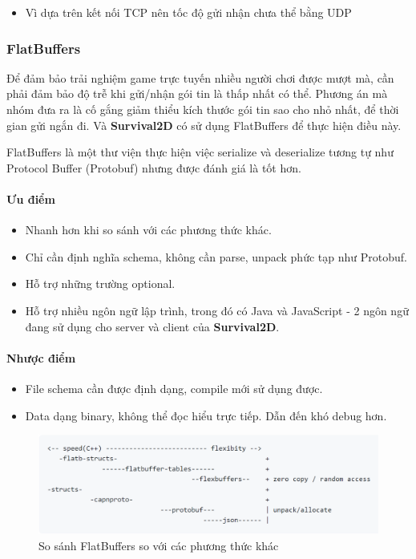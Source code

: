 \documentclass[12pt,a4paper]{article}
\begin{document}
  \begin{itemize}
      \item Vì dựa trên kết nối TCP nên tốc độ gửi nhận chưa thể bằng UDP
  \end{itemize}

  \subsubsection{FlatBuffers}
  Để đảm bảo trải nghiệm game trực tuyến nhiều người chơi được mượt mà, cần phải đảm bảo độ trễ khi gửi/nhận gói tin là thấp nhất có thể. Phương án mà nhóm đưa ra là cố gắng giảm thiểu kích thước gói tin sao cho nhỏ nhất, để thời gian gửi ngắn đi. Và \textbf{Survival2D} có sử dụng FlatBuffers để thực hiện điều này.
  
  FlatBuffers là một thư viện thực hiện việc serialize và deserialize tương tự như Protocol Buffer (Protobuf) nhưng được đánh giá là tốt hơn.

  \paragraph{Ưu điểm}
  \begin{itemize}
      \item Nhanh hơn khi so sánh với các phương thức khác.
        \item Chỉ cần định nghĩa schema, không cần parse, unpack phức tạp như Protobuf.
        \item Hỗ trợ những trường optional.
        \item Hỗ trợ nhiều ngôn ngữ lập trình, trong đó có Java và JavaScript - 2 ngôn ngữ đang sử dụng cho server và client của \textbf{Survival2D}.
  \end{itemize} 
  
  \paragraph{Nhược điểm}
  \begin{itemize}
      \item File schema cần được định dạng, compile mới sử dụng được.
      \item Data dạng binary, không thể đọc hiểu trực tiếp. Dẫn đến khó debug hơn.
  \end{itemize}

  \begin{figure}[H]
    \centering
    \includegraphics[width=\textwidth]{Img/flatbuffers/compare.png}
    \caption{So sánh FlatBuffers so với các phương thức khác \protect\footnotemark}
    \label{flatbuffers_compasions}
  \end{figure}
\end{document}
